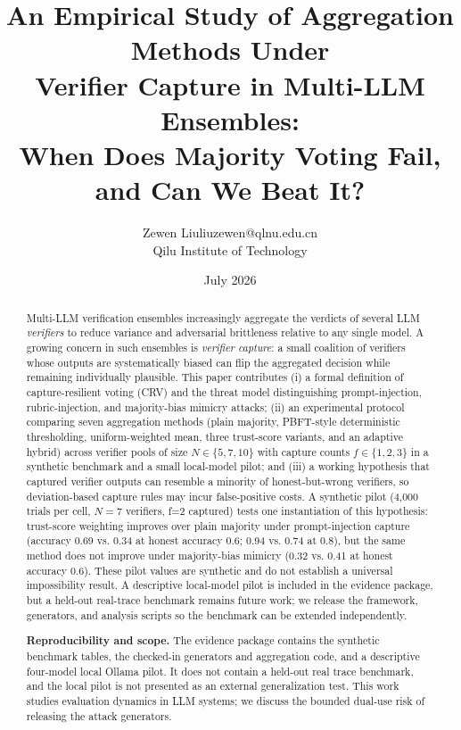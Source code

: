 \documentclass[11pt]{article}
\title{An Empirical Study of Aggregation Methods Under\\
       Verifier Capture in Multi-LLM Ensembles:\\
       When Does Majority Voting Fail, and Can We Beat It?}
\author{\name Zewen Liu\email liuzewen@qlnu.edu.cn\\\addr Qilu Institute of Technology}  %
\date{July 2026}
\begin{document}
\maketitle

\begin{abstract}
Multi-LLM verification ensembles increasingly aggregate the verdicts of
several LLM \emph{verifiers} to reduce variance and adversarial
brittleness relative to any single model. A growing concern in such
ensembles is \emph{verifier capture}: a small coalition of verifiers
whose outputs are systematically biased can flip the aggregated
decision while remaining individually plausible. This paper contributes
(i) a formal definition of capture-resilient voting (\textsc{CRV}) and
the threat model distinguishing prompt-injection, rubric-injection, and
majority-bias mimicry attacks; (ii) an experimental
protocol comparing seven aggregation methods (plain majority,
PBFT-style deterministic thresholding, uniform-weighted mean, three
trust-score variants, and an adaptive hybrid) across verifier pools of
size $N \in \{5,7,10\}$ with capture counts $f \in \{1,2,3\}$ in a
synthetic benchmark and a small local-model pilot; and (iii) a working
hypothesis that captured verifier outputs can resemble a minority of
honest-but-wrong verifiers, so deviation-based capture rules may incur
false-positive costs. A synthetic pilot (4,000 trials per cell, $N=7$
verifiers, f=2 captured) tests one instantiation of this hypothesis:
trust-score weighting improves over plain majority under prompt-injection
capture (accuracy 0.69 vs. 0.34 at honest accuracy 0.6; 0.94 vs. 0.74 at
0.8), but the same method does not improve under majority-bias mimicry
(0.32 vs. 0.41 at honest accuracy 0.6). These pilot values are synthetic and
do not establish a universal impossibility result. A descriptive local-model
pilot is included in the evidence package, but a held-out real-trace benchmark
remains future work; we release the framework, generators, and analysis
scripts so the benchmark can be extended independently.


\textbf{Reproducibility and scope.} The evidence package contains the synthetic
benchmark tables, the checked-in generators and aggregation code, and a
descriptive four-model local Ollama pilot. It does not contain a held-out real
trace benchmark, and the local pilot is not presented as an external
generalization test. This work studies evaluation dynamics in LLM systems;
we discuss the bounded dual-use risk of releasing the attack generators.
\end{abstract}
\end{document}
